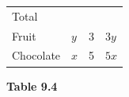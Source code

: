{\begin{mdframed}[linewidth=4, leftmargin=40, rightmargin=40]
\begin{exercise}
\begin{enumerate}[noitemsep, label=\textbf{Step} \textbf{\arabic*}. ]
{\begin{center}
\begin{xtabular*}{\mytablewidth}[t]{|p{10\mystarwidth}|p{10\mystarwidth}|p{10\mystarwidth}|p{10\mystarwidth}|}
        Total%
     \tabularnewline{}
        Fruit &
                  $y$
                 &
        3 &
                  $3y$
     \tabularnewline{}
        Chocolate &
                  $x$
                 &
        5 &
                  $5x$
     \tabularnewline{}
    \end{xtabular*}
      \end{center}
    \begin{center}{\small\bfseries Table 9.4}\end{center}
}
\end{enumerate}
\end{exercise}
\end{mdframed}}
